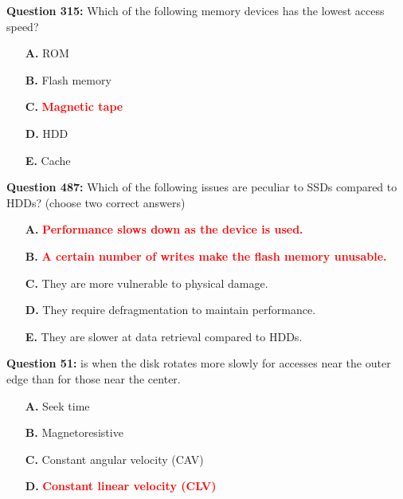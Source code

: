 \documentclass[12pt,a4paper]{article}
\begin{document}
\vspace{0.5cm}

\vspace{0.5cm}

\textbf{Question 315:} Which of the following memory devices has the lowest access speed?

\begin{itemize}
    \item[\textbf{A.}] ROM
    \item[\textbf{B.}] Flash memory
    \item[\textbf{C.}] \textcolor{red}{\textbf{Magnetic tape}}
    \item[\textbf{D.}] HDD
    \item[\textbf{E.}] Cache
\end{itemize}

\vspace{0.5cm}

\vspace{0.5cm}

\textbf{Question 487:} Which of the following issues are peculiar to SSDs compared to HDDs? (choose two correct answers)

\begin{itemize}
    \item[\textbf{A.}] \textcolor{red}{\textbf{Performance slows down as the device is used.}}
    \item[\textbf{B.}] \textcolor{red}{\textbf{A certain number of writes make the flash memory unusable.}}
    \item[\textbf{C.}] They are more vulnerable to physical damage.
    \item[\textbf{D.}] They require defragmentation to maintain performance.
    \item[\textbf{E.}] They are slower at data retrieval compared to HDDs.
\end{itemize}

\vspace{0.5cm}

\vspace{0.5cm}

\textbf{Question 51:} \underline{\hspace{1.5cm}} is when the disk rotates more slowly for accesses near the outer edge than for those near the center.

\begin{itemize}
    \item[\textbf{A.}] Seek time
    \item[\textbf{B.}] Magnetoresistive
    \item[\textbf{C.}] Constant angular velocity (CAV)
    \item[\textbf{D.}] \textcolor{red}{\textbf{Constant linear velocity (CLV)}}
\end{itemize}
\end{document}
